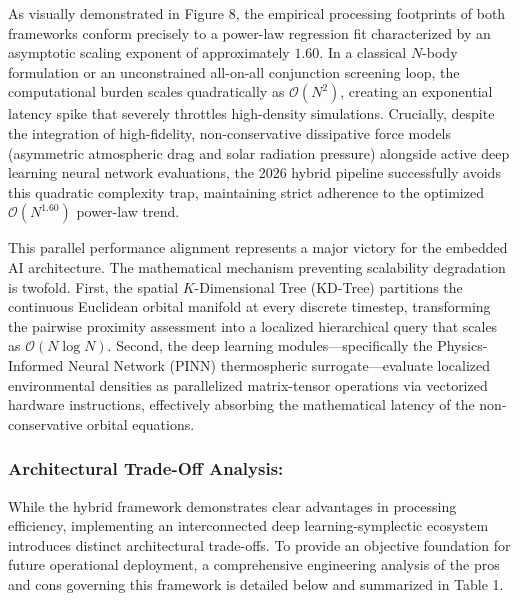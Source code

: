 \documentclass[letterpaper,11pt]{AAS}
\begin{document}
As visually demonstrated in Figure 8, the empirical processing footprints of both frameworks conform precisely to a power-law regression fit characterized by an asymptotic scaling exponent of approximately $1.60$. In a classical $N$-body formulation or an unconstrained all-on-all conjunction screening loop, the computational burden scales quadratically as $\mathcal{O}(N^2)$, creating an exponential latency spike that severely throttles high-density simulations. Crucially, despite the integration of high-fidelity, non-conservative dissipative force models (asymmetric atmospheric drag and solar radiation pressure) alongside active deep learning neural network evaluations, the 2026 hybrid pipeline successfully avoids this quadratic complexity trap, maintaining strict adherence to the optimized $\mathcal{O}(N^{1.60})$ power-law trend.

This parallel performance alignment represents a major victory for the embedded AI architecture. The mathematical mechanism preventing scalability degradation is twofold. First, the spatial $K$-Dimensional Tree (KD-Tree) partitions the continuous Euclidean orbital manifold at every discrete timestep, transforming the pairwise proximity assessment into a localized hierarchical query that scales as $\mathcal{O}(N \log N)$. Second, the deep learning modules—specifically the Physics-Informed Neural Network (PINN) thermospheric surrogate—evaluate localized environmental densities as parallelized matrix-tensor operations via vectorized hardware instructions, effectively absorbing the mathematical latency of the non-conservative orbital equations.

\subsubsection{Architectural Trade-Off Analysis:}
While the hybrid framework demonstrates clear advantages in processing efficiency, implementing an interconnected deep learning-symplectic ecosystem introduces distinct architectural trade-offs. To provide an objective foundation for future operational deployment, a comprehensive engineering analysis of the pros and cons governing this framework is detailed below and summarized in Table 1.
\end{document}
